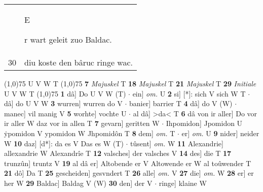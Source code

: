 \documentclass[8pt,a4paper,notitlepage]{article}
\begin{document}
\begin{table}[ht]
\begin{minipage}[t]{0.5\linewidth}
\begin{tabular}{rl}
 & \begin{large}E\end{large}r wart geleit zuo Baldac.\\ 
30 & diu koste den bâruc ringe wac.\\ 
\end{tabular}
\scriptsize
\line(1,0){75} \newline
U V W T \newline
\line(1,0){75} \newline
\textbf{7} \textit{Majuskel} T  \textbf{18} \textit{Majuskel} T  \textbf{21} \textit{Majuskel} T  \textbf{29} \textit{Initiale} U V W T  \newline
\line(1,0){75} \newline
\textbf{1} dâ] Do U V W (T)  $\cdot$ ein] \textit{om.} U \textbf{2} si] [*]: sich V sich W T  $\cdot$ dâ] do U V W \textbf{3} wurren] wurren do V  $\cdot$ banier] barrier T \textbf{4} dâ] do V (W)  $\cdot$ manec] vil manig V \textbf{5} worhte] vochte U  $\cdot$ al dâ] >da< T \textbf{6} dâ von ir aller] Do vor ir aller W daz vor in allen T \textbf{7} gevarn] geritten W  $\cdot$ Ihpomidon] Jpomidon U ẏpomidon V ypomidon W Jhpomidôn T \textbf{8} dem] \textit{om.} T  $\cdot$ er] \textit{om.} U \textbf{9} nider] neider W \textbf{10} daz] [d*]: da es V Das es W (T)  $\cdot$ tûsent] \textit{om.} W \textbf{11} Alexandrie] allexandrie W Alexandrîe T \textbf{12} valsches] der valsches V \textbf{14} des] die T \textbf{17} trunzûn] truntz V \textbf{19} al dâ er] Altobende er V Altowende er W al toûwender T \textbf{21} dô] Da T \textbf{25} gescheiden] gesvndert T \textbf{26} alle] \textit{om.} V \textbf{27} die] \textit{om.} W \textbf{28} er] er her W \textbf{29} Baldac] Baldag V (W) \textbf{30} den] der V  $\cdot$ ringe] klaine W \newline
\end{minipage}
\end{table}
\end{document}
